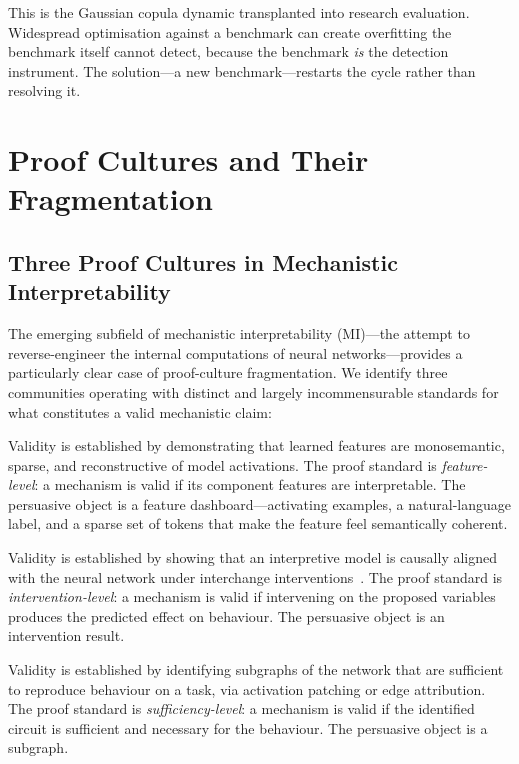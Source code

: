 \documentclass{article}
\begin{document}
This is the Gaussian copula dynamic transplanted into research evaluation. Widespread optimisation against a benchmark can create overfitting the benchmark itself cannot detect, because the benchmark \textit{is} the detection instrument. The solution---a new benchmark---restarts the cycle rather than resolving it.

\section{Proof Cultures and Their Fragmentation}
\label{sec:proof_cultures}

\subsection{Three Proof Cultures in Mechanistic Interpretability}

The emerging subfield of mechanistic interpretability (MI)---the attempt to reverse-engineer the internal computations of neural networks---provides a particularly clear case of proof-culture fragmentation. We identify three communities operating with distinct and largely incommensurable standards for what constitutes a valid mechanistic claim:

\begin{description}[leftmargin=*]
\item[Sparse autoencoders (SAE).] Validity is established by demonstrating that learned features are monosemantic, sparse, and reconstructive of model activations. The proof standard is \textit{feature-level}: a mechanism is valid if its component features are interpretable. The persuasive object is a feature dashboard---activating examples, a natural-language label, and a sparse set of tokens that make the feature feel semantically coherent.
\item[Causal abstraction.] Validity is established by showing that an interpretive model is causally aligned with the neural network under interchange interventions~\citep{geiger_causal_2021}. The proof standard is \textit{intervention-level}: a mechanism is valid if intervening on the proposed variables produces the predicted effect on behaviour. The persuasive object is an intervention result.
\item[Circuit discovery.] Validity is established by identifying subgraphs of the network that are sufficient to reproduce behaviour on a task, via activation patching or edge attribution. The proof standard is \textit{sufficiency-level}: a mechanism is valid if the identified circuit is sufficient and necessary for the behaviour. The persuasive object is a subgraph.
\end{description}
\end{document}
